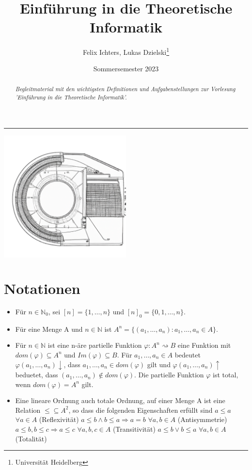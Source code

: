 \documentclass[DIV=15]{scrartcl}
\title{Einführung in die Theoretische Informatik}
\author{Felix Ichters, Lukas Dzielski\thanks{Universität Heidelberg}}
\date{Sommersemester 2023}
\begin{document}
\maketitle
\rule{467.1pt}{0.4pt}

\begin{abstract}
\begin{flushright}
    \textit{Begleitmaterial mit den wichtigsten Definitionen und Aufgabenstellungen zur Vorlesung 'Einführung in die Theoretische Informatik'.}
\end{flushright}    
\end{abstract}
\bigskip\bigskip
\begin{center}
\includegraphics[width=0.5\textwidth]{dall2.png}    
\end{center}

\newpage
\tableofcontents
\newpage
\section{Notationen}
\begin{itemize}
    \item Für \(n\in\mathbb{N}_0\), sei \([n]=\{1,\dots,n\}\) und \([n]_0=\{0,1,\dots,n\}\).
    \item Für eine Menge A und \(n\in\mathbb{N}\) ist \(A^n=\{(a_1,\dots,a_n):a_1,\dots,a_n\in A\}\).
    \item Für \(n\in\mathbb{N}\) ist eine n-äre partielle Funktion \(\varphi:A^n\rightsquigarrow B\) eine Funktion
    mit \(dom(\varphi)\subseteq A^n\) und \(Im(\varphi)\subseteq B\).
    Für \(a_1,\dots,a_n\in A\) bedeutet \(\varphi(a_1,\dots,a_n)\downarrow\), dass \(a_1,\dots,a_n\in dom(\varphi)\) gilt und 
    \(\varphi(a_1,\dots,a_n)\uparrow\) beduetet, dass \((a_1,\dots,a_n)\notin dom(\varphi)\).
    Die partielle Funktion \(\varphi\) ist total, wenn \(dom(\varphi)=A^n\) gilt.
    \item Eine lineare Ordnung auch totale Ordnung, auf einer Menge A ist eine Relation \(\leq\subseteq A^2\), so dass 
    die folgenden Eigenschaften erfüllt sind
        \subitem \(a\leq a\) \(\forall a\in A\) (Reflexivität)
        \subitem \(a\leq b\wedge b\leq a\Rightarrow a=b\) \(\forall a,b\in A\) (Antisymmetrie)
        \subitem \(a\leq b,b\leq c\Rightarrow a\leq c\) \(\forall a,b,c\in A\) (Transitivität)
        \subitem \(a\leq b\vee b\leq a\) \(\forall a,b\in A\) (Totalität)
\end{itemize}
\newpage
\end{document}
